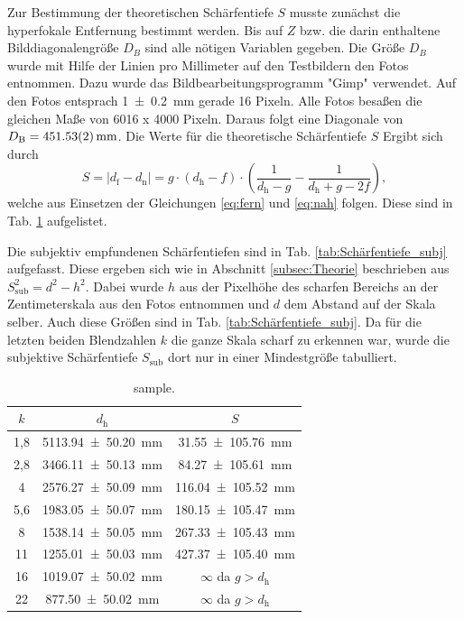 		Zur Bestimmung der theoretischen Schärfentiefe $S$ musste zunächst die hyperfokale Entfernung bestimmt werden.
		Bis auf $Z$ bzw. die darin enthaltene Bilddiagonalengröße $D_B$ sind alle nötigen Variablen gegeben.
		Die Größe $D_B$ wurde mit Hilfe der Linien pro Millimeter auf den Testbildern den Fotos entnommen.
		Dazu wurde das Bildbearbeitungsprogramm "Gimp"\cite{Gimp} verwendet.
		Auf den Fotos entsprach \SI{1+-0,2}{\milli\meter} gerade 16 Pixeln.
		Alle Fotos besaßen die gleichen Maße von 6016 x 4000 Pixeln.
		Daraus folgt eine Diagonale von $D_\text{B} = \SI{451,53+-0,02}{\milli\meter}$.
		Die Werte für die theoretische Schärfentiefe $S$ Ergibt sich durch
		\begin{equation}
			S = |d_\text{f}-d_\text{n}| = g\cdot (d_\text{h}-f) \cdot \left( \frac{1}{d_\text{h} - g} - \frac{1}{d_\text{h} + g -2f} \right),
		\end{equation}
		welche aus Einsetzen der Gleichungen \ref{eq:fern} und \ref{eq:nah} folgen.
		Diese sind in Tab. \ref{tab:Schärfentiefe_theo} aufgelistet.
		
		Die subjektiv empfundenen Schärfentiefen sind in Tab. \ref{tab:Schärfentiefe_subj} aufgefasst.
		Diese ergeben sich wie in Abschnitt \ref{subsec:Theorie} beschrieben aus $S_\text{sub}^2 = d^2 - h^2$.
		Dabei wurde $h$ aus der Pixelhöhe des scharfen Bereichs an der Zentimeterskala aus den Fotos entnommen und $d$ dem Abstand auf der Skala selber.
		Auch diese Größen sind in Tab. \ref{tab:Schärfentiefe_subj}.
		Da für die letzten beiden Blendzahlen $k$ die ganze Skala scharf zu erkennen war, wurde die subjektive Schärfentiefe $S_\text{sub}$ dort nur in einer Mindestgröße tabulliert.
			
		\begin{table}[ht]
			\centering
			\begin{tabular}{c|c|c|}
				$k$ & $d_\text{h}$ & $S$ \\
				\hline
				1,8 &  \SI{5113.94+-50.20}{\milli\meter} &  \SI{31.55+-105.76}{\milli\meter} \\
				2,8 &  \SI{3466.11+-50.13}{\milli\meter} &  \SI{84.27+-105.61}{\milli\meter} \\
				4 &  \SI{2576.27+-50.09}{\milli\meter} &  \SI{116.04+-105.52}{\milli\meter} \\
				5,6 &  \SI{1983.05+-50.07}{\milli\meter} &  \SI{180.15+-105.47}{\milli\meter} \\
				8 &  \SI{1538.14+-50.05}{\milli\meter} &  \SI{267.33+-105.43}{\milli\meter} \\
				11 &  \SI{1255.01+-50.03}{\milli\meter} &  \SI{427.37+-105.40}{\milli\meter} \\
				16 &  \SI{1019.07+-50.02}{\milli\meter} & $\infty$ da $ g > d_\text{h}$ \\
				22 &  \SI{877.50+-50.02}{\milli\meter} & $\infty$ da $ g > d_\text{h}$ \\
			\end{tabular}
			\caption{sample.}
			\label{tab:Schärfentiefe_theo}
		\end{table}
		
